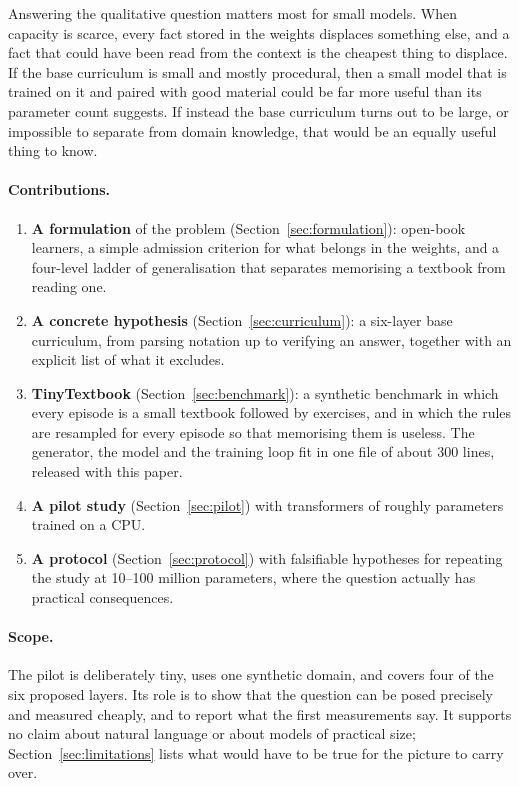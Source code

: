 \documentclass[11pt]{article}
\begin{document}
Answering the qualitative question matters most for small models.
When capacity is scarce, every fact stored in the weights displaces something else, and a fact that could have been read from the context is the cheapest thing to displace.
If the base curriculum is small and mostly procedural, then a small model that is trained on it and paired with good material could be far more useful than its parameter count suggests.
If instead the base curriculum turns out to be large, or impossible to separate from domain knowledge, that would be an equally useful thing to know.

\paragraph{Contributions.}
\begin{enumerate}
\item \textbf{A formulation} of the problem (Section~\ref{sec:formulation}): open-book learners, a simple admission criterion for what belongs in the weights, and a four-level ladder of generalisation that separates memorising a textbook from reading one.
\item \textbf{A concrete hypothesis} (Section~\ref{sec:curriculum}): a six-layer base curriculum, from parsing notation up to verifying an answer, together with an explicit list of what it excludes.
\item \textbf{TinyTextbook} (Section~\ref{sec:benchmark}): a synthetic benchmark in which every episode is a small textbook followed by exercises, and in which the rules are resampled for every episode so that memorising them is useless. The generator, the model and the training loop fit in one file of about 300 lines, released with this paper.
\item \textbf{A pilot study} (Section~\ref{sec:pilot}) with transformers of roughly \NparamsRounded{} parameters trained on a CPU. 
\item \textbf{A protocol} (Section~\ref{sec:protocol}) with falsifiable hypotheses for repeating the study at 10--100 million parameters, where the question actually has practical consequences.
\end{enumerate}

\paragraph{Scope.}
The pilot is deliberately tiny, uses one synthetic domain, and covers four of the six proposed layers.
Its role is to show that the question can be posed precisely and measured cheaply, and to report what the first measurements say.
It supports no claim about natural language or about models of practical size; Section~\ref{sec:limitations} lists what would have to be true for the picture to carry over.
\end{document}
